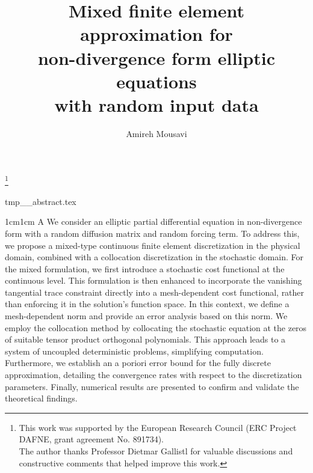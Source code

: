 \documentclass[final,onefignum,onetabnum]{mousaviart}
\title{Mixed finite element approximation for\\ non-divergence form elliptic equations\\ with random input data}
\author{\vspace*{5mm}Amireh Mousavi}
\newcommand{\FancyAbstractTitle}[1]{%
	{\fontsize{9pt}{1pt}\selectfont #1} %
}
\begin{document}
	\maketitle
	\renewcommand{\footnoterule}{%
		\kern -3pt%
		\hrule width 0.2\linewidth height 0.2pt
		\kern 4pt
	}
	\begingroup
	\renewcommand\thefootnote{}%
	\footnote{This work was supported by the European Research Council (ERC Project DAFNE, grant agreement No. 891734).
	\\
		The author thanks Professor Dietmar Gallistl for valuable discussions and constructive comments that helped improve this work.}%
	\addtocounter{footnote}{-1}%
	\endgroup
	
	\begin{tcbverbatimwrite}{tmp_\jobname_abstract.tex}
		\begin{center}
			\begin{adjustwidth}{1cm}{1cm} %
				\noindent
				{\FancyAbstractTitle{A}{\hspace*{-.8mm}}\fontsize{6pt}{1pt}\selectfont{BSTRACT.}}\quad
				\footnotesize
			We consider an elliptic partial differential equation in non-divergence form with a random diffusion matrix and random forcing term.
			To address this, we propose a mixed-type continuous finite element discretization in the physical domain, combined with a collocation discretization in the stochastic domain.
			For the mixed formulation, we first introduce a stochastic cost functional at the continuous level. This formulation is then enhanced to incorporate the vanishing tangential trace constraint directly into a mesh-dependent cost functional, rather than enforcing it in the solution’s function space. In this context, we define a mesh-dependent norm and provide an error analysis based on this norm.
			We employ the collocation method by collocating the stochastic equation at the zeros of suitable tensor product orthogonal polynomials. This approach leads to a system of uncoupled deterministic problems, simplifying computation.
			Furthermore, we establish an a poriori error bound for the fully discrete approximation, detailing the convergence rates with respect to the discretization parameters. Finally, numerical results are presented to confirm and validate the theoretical findings.
		\end{adjustwidth}
	\end{center}
		
%		
	\end{tcbverbatimwrite}
\end{document}
